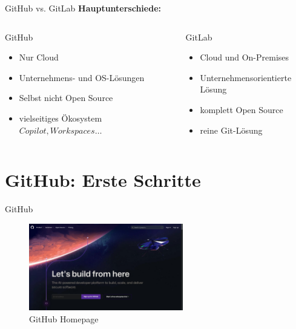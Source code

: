 \documentclass[compress,aspectratio=169]{beamer}
\begin{document}
	\begin{frame}{GitHub vs. GitLab}
		\textbf{Hauptunterschiede:}
		\vspace{1em}
		\begin{columns}
			\begin{column}{0.5\textwidth}
				GitHub
				\begin{itemize}
					\item Nur Cloud
					\item Unternehmens- und OS-Lösungen
					\item Selbst nicht Open Source
					\item vielseitiges Ökosystem \(Copilot, Workspaces \dots\)
				\end{itemize}
			\end{column}
			\begin{column}{0.5\textwidth}
				GitLab
				\begin{itemize}
					\item Cloud und On-Premises
					\item Unternehmensorientierte Lösung
					\item komplett Open Source
					\item reine Git-Lösung
				\end{itemize}
			\end{column}
		\end{columns}
	\end{frame}
		

	\section{GitHub: Erste Schritte}
	
	\begin{frame}{GitHub}
		\begin{figure}
			\includegraphics[width=0.6\textwidth]{assets/github/github-home.jpg}
			\caption{GitHub Homepage}
		\end{figure}
	\end{frame}
\end{document}
